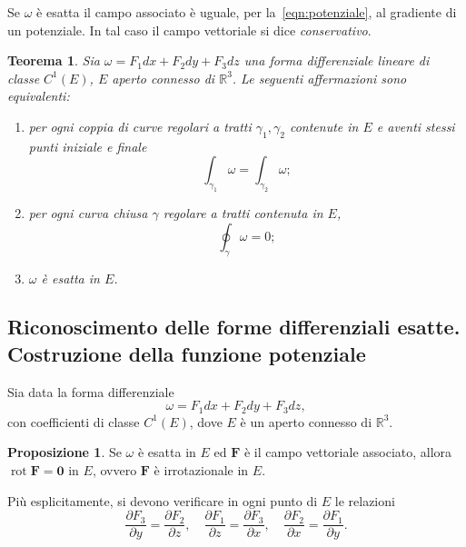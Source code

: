 \documentclass[a4paper]{book}
\DeclareMathOperator{\rot}{rot}
\numberwithin{equation}{section}
\theoremstyle{plain}
\newtheorem{teor}{Teorema}[section]
\theoremstyle{definition}
\newtheorem{prop}{Proposizione}[section]
\theoremstyle{remark}
\renewcommand{\vec}{\boldsymbol}
\theoremstyle{example}
\begin{document}
Se $\omega$ è esatta il campo associato è uguale, per la~\eqref{eqn:potenziale}, al gradiente di un potenziale. In tal caso il campo vettoriale si dice \emph{conservativo}.

\begin{teor}
	Sia $\omega = F_1dx + F_2dy + F_3dz$ una forma differenziale lineare di classe $C^1(E)$, $E$ aperto connesso di $\mathbb{R}^3$. Le seguenti affermazioni sono equivalenti:
	\begin{enumerate}
		\item per ogni coppia di curve regolari a tratti $\gamma_1, \gamma_2$ contenute in $E$ e aventi stessi punti iniziale e finale
		\begin{equation*}
			\int_{\gamma_1}\omega = \int_{\gamma_2}\omega;
		\end{equation*}
		\item per ogni curva chiusa $\gamma$ regolare a tratti contenuta in $E$,
		\begin{equation*}
			\oint_{\gamma} \omega = 0;
		\end{equation*}
		\item $\omega$ è esatta in $E$.
	\end{enumerate}
\end{teor}

\subsection{Riconoscimento delle forme differenziali esatte. Costruzione della funzione potenziale}
Sia data la forma differenziale
\begin{equation*}
	\omega = F_1dx + F_2 dy + F_3dz,
\end{equation*}
con coefficienti di classe $C^1(E)$, dove $E$ è un aperto connesso di $\mathbb{R}^3$.

\begin{prop}
	Se $\omega$ è esatta in $E$ ed $\vec{F}$ è il campo vettoriale associato, allora $\rot{\vec{F}} = \vec{0}$ in $E$, ovvero $\vec{F}$ è irrotazionale in $E$.
\end{prop}

Più esplicitamente, si devono verificare in ogni punto di $E$ le relazioni
\begin{equation}
	\label{eqn:irrot}
	\frac{\partial F_3}{\partial y} = \frac{\partial F_2}{\partial z}, \quad \frac{\partial F_1}{\partial z} = \frac{\partial F_3}{\partial x}, \quad \frac{\partial F_2}{\partial x} = \frac{\partial F_1}{\partial y}.
\end{equation}
\end{document}
